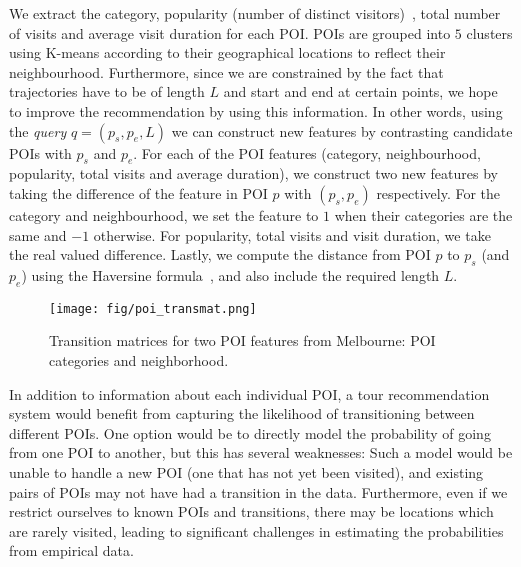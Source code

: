 We extract the category, popularity (number of distinct visitors)~\cite{ht10}, total number of visits and average visit duration for each POI.
POIs are grouped into $5$ clusters using K-means according to their geographical locations to reflect their neighbourhood.
Furthermore, since we are constrained by the fact that trajectories have to be of length $L$ and start and end at certain points, we hope to improve the recommendation by using this information.
In other words, using the \textit{query} $q = (p_s, p_e, L)$ we can construct new features by contrasting candidate POIs with $p_s$ and $p_e$.
%
For each of the POI features (category, neighbourhood, popularity, total visits and average duration),
we construct two new features by taking the difference of the feature in POI $p$ with $(p_s, p_e)$ respectively.
For the category and neighbourhood, we set the feature to $1$ when their categories are the same and $-1$ otherwise.
For popularity, total visits and visit duration, we take the real valued difference.
Lastly, we compute the distance from POI $p$ to $p_s$ (and $p_e$) using the Haversine formula~\cite{haversine},
and also include the required length $L$.




\begin{figure}[t]
\texttt{[image: fig/poi\_transmat.png]}
\caption{Transition matrices for two POI features from Melbourne: POI categories and neighborhood.
}
\label{fig:transmat}\captionmoveup
\end{figure}


In addition to information about each individual POI, a tour recommendation system would benefit
from capturing the likelihood of transitioning between different POIs. One option would be to
directly model the probability of going from one POI to another, but this has several weaknesses:
Such a model would be unable to handle a new POI (one that has not yet been visited),
and existing pairs of POIs may not have had a transition in the data.
Furthermore, even if we restrict ourselves to known POIs and transitions,
there may be locations which are rarely visited,
leading to significant challenges in estimating the probabilities from empirical data.

